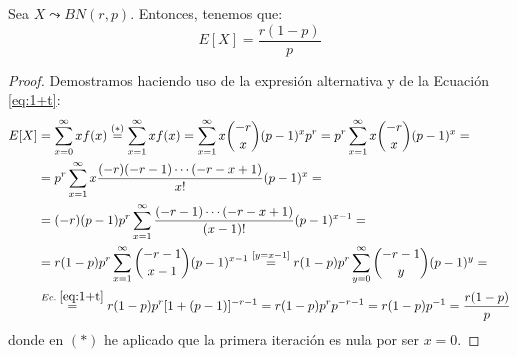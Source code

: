 \begin{prop}
    Sea $X\leadsto BN(r,p)$. Entonces, tenemos que:
    \begin{equation*}
        E[X]=\frac{r(1-p)}{p}
    \end{equation*}
\end{prop}
\begin{proof}
    Demostramos haciendo uso de la expresión alternativa y de la Ecuación \ref{eq:1+t}:
    \begin{equation*}\begin{split}
        E[X]
        &=\sum_{x=0}^\infty xf(x)
        \stackrel{(\ast)}{=}\sum_{x=1}^\infty xf(x)
        =\sum_{x=1}^\infty x\binom{-r}{x}(p-1)^xp^r
        =p^r\sum_{x=1}^\infty x\binom{-r}{x}(p-1)^x
        =\\&= p^r\sum_{x=1}^\infty x\frac{(-r)(-r-1)\cdots (-r-x+1)}{x!}(p-1)^x
        =\\&= (-r)(p-1)p^r\sum_{x=1}^\infty \frac{(-r-1)\cdots (-r-x+1)}{(x-1)!}(p-1)^{x-1}
        =\\&= r(1-p)p^r\sum_{x=1}^\infty \binom{-r-1}{x-1}(p-1)^{x-1}
        \stackrel{[y=x-1]}{=} r(1-p)p^r\sum_{y=0}^\infty \binom{-r-1}{y}(p-1)^{y}
        = \\ &\stackrel{Ec.\;\ref{eq:1+t}}{=} r(1-p)p^r[1+(p-1)]^{-r-1}
        = r(1-p)p^r p^{-r-1}
        = r(1-p)p^{-1} = \frac{r(1-p)}{p}
    \end{split}\end{equation*}
    donde en $(\ast)$ he aplicado que la primera iteración es nula por ser $x=0$.
\end{proof}

